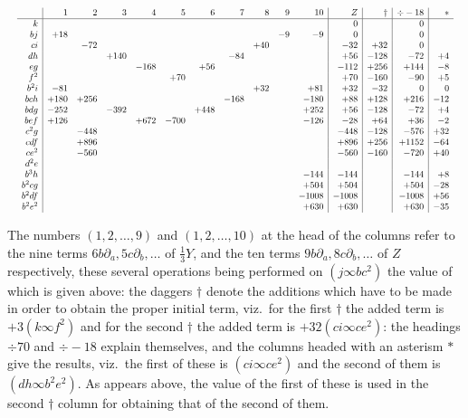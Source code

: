 \documentclass[11pt]{article}
\begin{document}
\[
\resizebox{\textwidth}{!}{$\displaystyle
\begin{array}{r|rrrrrrrrrr|r|r|r|r}
&1&2&3&4&5&6&7&8&9&10&
Z&\dagger&\div -18&*\\ \hline
k&&&&&&&&&&&0&&0&\\
bj&+18&&&&&&&&-9&-9&0&&0&\\
ci&&-72&&&&&&+40&&&-32&+32&0&\\
dh&&&+140&&&&-84&&&&+56&-128&-72&+4\\
eg&&&&-168&&+56&&&&&-112&+256&+144&-8\\
f^2&&&&&+70&&&&&&+70&-160&-90&+5\\
b^2i&-81&&&&&&&+32&&+81&+32&-32&0&0\\
bch&+180&+256&&&&&-168&&&-180&+88&+128&+216&-12\\
bdg&-252&&-392&&&+448&&&&+252&+56&-128&-72&+4\\
bef&+126&&&+672&-700&&&&&-126&-28&+64&+36&-2\\
c^2g&&-448&&&&&&&&&-448&-128&-576&+32\\
cdf&&+896&&&&&&&&&+896&+256&+1152&-64\\
ce^2&&-560&&&&&&&&&-560&-160&-720&+40\\
d^2e&&&&&&&&&&&&&&\\
b^3h&&&&&&&&&&-144&-144&&-144&+8\\
b^2cg&&&&&&&&&&+504&+504&&+504&-28\\
b^2df&&&&&&&&&&-1008&-1008&&-1008&+56\\
b^2e^2&&&&&&&&&&+630&+630&&+630&-35
\end{array}
$}
\]

\clearpage
The numbers $(1, 2, \ldots, 9)$ and $(1, 2, \ldots, 10)$ at the head of the columns refer to the nine terms $6b\partial_a, 5c\partial_b, \ldots$ of $\tfrac{1}{3} Y$, and the ten terms $9b\partial_a, 8c\partial_b, \ldots$ of $Z$ respectively, these several operations being performed on $(j \infty bc^2)$ the value of which is given above: the daggers $\dagger$ denote the additions which have to be made in order to obtain the proper initial term, viz.\ for the first $\dagger$ the added term is $+ 3(k \infty f^2)$ and for the second $\dagger$ the added term is $+ 32(ci \infty ce^2)$: the headings $\div 70$ and $\div -18$ explain themselves, and the columns headed with an asterism $*$ give the results, viz.\ the first of these is $(ci \infty ce^2)$ and the second of them is $(dh \infty b^2e^2)$. As appears above, the value of the first of these is used in the second $\dagger$ column for obtaining that of the second of them.
\end{document}
